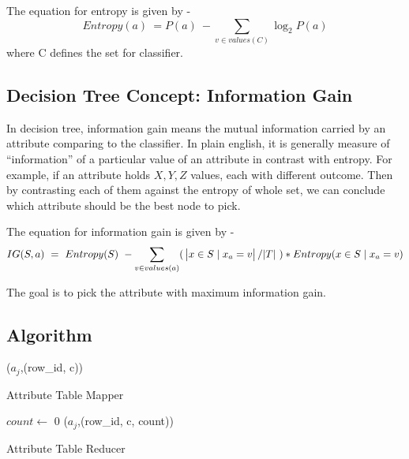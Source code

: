 \documentclass{article}
\begin{document}
The equation for entropy is given by -
\begin{equation}
Entropy(a)\ = P(a)\ - \sum_{v \in values(C)}\log_{2}{P(a)}
\end{equation}
where C defines the set for classifier.

\subsection{Decision Tree Concept: Information Gain}
In decision tree, information gain means the mutual information carried by an attribute comparing to the classifier\cite{wikiinfogain}. In plain english, it is generally measure of ``information'' of a particular value of an attribute in contrast with entropy. For example, if an attribute holds ${X,Y,Z}$ values, each with different outcome. Then by contrasting each of them against the entropy of whole set, we can conclude which attribute should be the best node to pick.

The equation for information gain is given by -
\begin{equation}
IG(S, a)\ =\ Entropy(S)\ - \sum_{v \in values(a)}(\ \abs{x \in S\mid x_{a} = v}/\abs{T}\ ) * Entropy(x \in S\mid x_{a} = v)
\end{equation}

The goal is to pick the attribute with maximum information gain.

\subsection{Algorithm}

\IncMargin{1em}
\begin{algorithm}[H]
\DontPrintSemicolon
{}
\BlankLine
\emit(${a_{j}}$,(row\_id, c))
\caption{Attribute Table Mapper\label{algo:atmap}}
\end{algorithm}
\DecMargin{1em}

\IncMargin{1em}
\begin{algorithm}[H]
\DontPrintSemicolon
{}
\BlankLine
$count\leftarrow$ 0\;
\emit(${a_{j}}$,(row\_id, c, count))
\caption{Attribute Table Reducer\label{algo:atred}}
\end{algorithm}
\DecMargin{1em}
\end{document}
